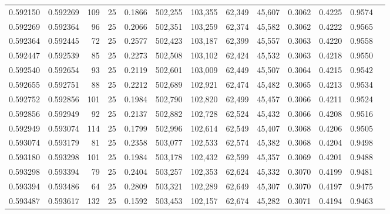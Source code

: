 \begin{tabular}{rrrrrrrrrrrrr}
0.592150 & 0.592269 &   109 &  25 &                                     0.1866 & 502,255 & 103,355 &  62,349 &  45,607 & 0.3062 & 0.4225 & 0.9574 \\
0.592269 & 0.592364 &    96 &  25 &                                     0.2066 & 502,351 & 103,259 &  62,374 &  45,582 & 0.3062 & 0.4222 & 0.9565 \\
0.592364 & 0.592445 &    72 &  25 &                                     0.2577 & 502,423 & 103,187 &  62,399 &  45,557 & 0.3063 & 0.4220 & 0.9558 \\
0.592447 & 0.592539 &    85 &  25 &                                     0.2273 & 502,508 & 103,102 &  62,424 &  45,532 & 0.3063 & 0.4218 & 0.9550 \\
0.592540 & 0.592654 &    93 &  25 &                                     0.2119 & 502,601 & 103,009 &  62,449 &  45,507 & 0.3064 & 0.4215 & 0.9542 \\
0.592655 & 0.592751 &    88 &  25 &                                     0.2212 & 502,689 & 102,921 &  62,474 &  45,482 & 0.3065 & 0.4213 & 0.9534 \\
0.592752 & 0.592856 &   101 &  25 &                                     0.1984 & 502,790 & 102,820 &  62,499 &  45,457 & 0.3066 & 0.4211 & 0.9524 \\
0.592856 & 0.592949 &    92 &  25 &                                     0.2137 & 502,882 & 102,728 &  62,524 &  45,432 & 0.3066 & 0.4208 & 0.9516 \\
0.592949 & 0.593074 &   114 &  25 &                                     0.1799 & 502,996 & 102,614 &  62,549 &  45,407 & 0.3068 & 0.4206 & 0.9505 \\
0.593074 & 0.593179 &    81 &  25 &                                     0.2358 & 503,077 & 102,533 &  62,574 &  45,382 & 0.3068 & 0.4204 & 0.9498 \\
0.593180 & 0.593298 &   101 &  25 &                                     0.1984 & 503,178 & 102,432 &  62,599 &  45,357 & 0.3069 & 0.4201 & 0.9488 \\
0.593298 & 0.593394 &    79 &  25 &                                     0.2404 & 503,257 & 102,353 &  62,624 &  45,332 & 0.3070 & 0.4199 & 0.9481 \\
0.593394 & 0.593486 &    64 &  25 &                                     0.2809 & 503,321 & 102,289 &  62,649 &  45,307 & 0.3070 & 0.4197 & 0.9475 \\
0.593487 & 0.593617 &   132 &  25 &                                     0.1592 & 503,453 & 102,157 &  62,674 &  45,282 & 0.3071 & 0.4194 & 0.9463 \\

\end{tabular}
